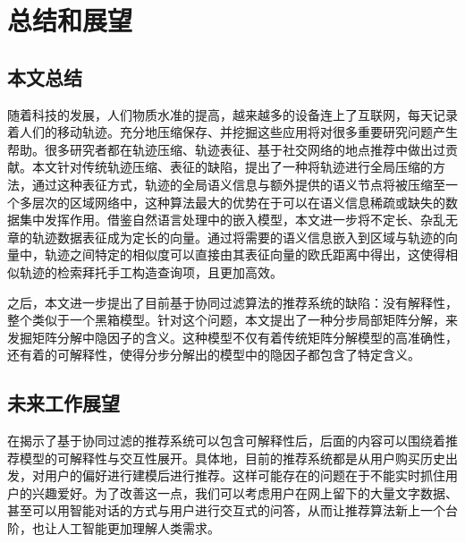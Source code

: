 
\chapter{总结和展望}
\label{chapter:conclusion}

\section{本文总结}
随着科技的发展，人们物质水准的提高，越来越多的设备连上了互联网，每天记录着人们的移动轨迹。充分地压缩保存、并挖掘这些应用将对很多重要研究问题产生帮助。很多研究者都在轨迹压缩、轨迹表征、基于社交网络的地点推荐中做出过贡献。本文针对传统轨迹压缩、表征的缺陷，提出了一种将轨迹进行全局压缩的方法，通过这种表征方式，轨迹的全局语义信息与额外提供的语义节点将被压缩至一个多层次的区域网络中，这种算法最大的优势在于可以在语义信息稀疏或缺失的数据集中发挥作用。借鉴自然语言处理中的嵌入模型，本文进一步将不定长、杂乱无章的轨迹数据表征成为定长的向量。通过将需要的语义信息嵌入到区域与轨迹的向量中，轨迹之间特定的相似度可以直接由其表征向量的欧氏距离中得出，这使得相似轨迹的检索拜托手工构造查询项，且更加高效。

之后，本文进一步提出了目前基于协同过滤算法的推荐系统的缺陷：没有解释性，整个类似于一个黑箱模型。针对这个问题，本文提出了一种分步局部矩阵分解，来发掘矩阵分解中隐因子的含义。这种模型不仅有着传统矩阵分解模型的高准确性，还有着的可解释性，使得分步分解出的模型中的隐因子都包含了特定含义。


\section{未来工作展望}
在揭示了基于协同过滤的推荐系统可以包含可解释性后，后面的内容可以围绕着推荐模型的可解释性与交互性展开。具体地，目前的推荐系统都是从用户购买历史出发，对用户的偏好进行建模后进行推荐。这样可能存在的问题在于不能实时抓住用户的兴趣爱好。为了改善这一点，我们可以考虑用户在网上留下的大量文字数据、甚至可以用智能对话的方式与用户进行交互式的问答，从而让推荐算法新上一个台阶，也让人工智能更加理解人类需求。
